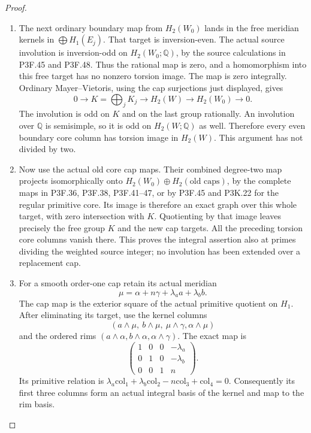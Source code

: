 \begin{proof}
\begin{enumerate}[label=\arabic*.]
\item The next ordinary boundary map from $H_2(W_0)$ lands
in the free meridian kernels in $\bigoplus H_1(E_j)$.
That target is inversion-even. The actual source
involution is inversion-odd on $H_2(W_0;\mathbb Q)$,
by the source calculations in P3F.45 and P3F.48.
Thus the rational map is zero, and a homomorphism into
this free target has no nonzero torsion image. The map
is zero integrally. Ordinary Mayer--Vietoris, using
the cap surjections just displayed, gives
\[
 0\longrightarrow K=\bigoplus_jK_j
  \longrightarrow H_2(W)
  \longrightarrow H_2(W_0)\longrightarrow0.             \tag{K32.13}
\]
The involution is odd on $K$ and on the last group
rationally. An involution over $\mathbb Q$ is semisimple,
so it is odd on $H_2(W;\mathbb Q)$ as well. Therefore
every even boundary core column has torsion image in
$H_2(W)$. This argument has not divided by two.

\item Now use the actual old core cap maps. Their combined
degree-two map projects isomorphically onto
$H_2(W_0)\oplus H_2(\text{old caps})$, by the complete
maps in P3F.36, P3F.38, P3F.41--47, or by P3F.45 and
P3K.22 for the regular primitive core. Its image is
therefore an exact graph over this whole target, with
zero intersection with $K$. Quotienting by that image
leaves precisely the free group $K$ and the new cap
targets. All the preceding torsion core columns vanish
there. This proves the integral assertion also at
primes dividing the weighted source integer; no
involution has been extended over a replacement cap.

\item For a smooth order-one cap retain its actual meridian
\[
          \mu=\alpha+n\gamma+\lambda_a a+\lambda_b b.
\]
The cap map is the exterior square of the actual
primitive quotient on $H_1$. After eliminating its
target, use the kernel columns
\[
 (a\wedge\mu,\ b\wedge\mu,\ \mu\wedge\gamma,
                                      \alpha\wedge\mu)
\]
and the ordered rims
$(a\wedge\alpha,b\wedge\alpha,\alpha\wedge\gamma)$.
The exact map is
\[
 \begin{pmatrix}
 1&0&0&-\lambda_a\\
 0&1&0&-\lambda_b\\
 0&0&1&n
 \end{pmatrix}.                                      \tag{K32.14}
\]
Its primitive relation is
$\lambda_a\mathrm{col}_1+\lambda_b\mathrm{col}_2
-n\mathrm{col}_3+\mathrm{col}_4=0$.
Consequently its first three columns form an actual
integral basis of the kernel and map to the rim basis.


\end{enumerate}
\end{proof}
